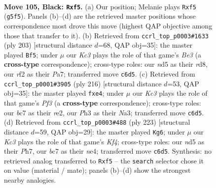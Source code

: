 \documentclass[11pt]{article}
\begin{document}
\clearpage

\begin{figure}[p]\centering
\begin{subfigure}{0.46\textwidth}\centering
\resizebox{\linewidth}{!}{%
\newchessgame
\chessboard[
  setfen={8/2B5/PPk5/3N1Brb/1K6/7p/5R2/8 b - - 10 105},
  showmover=false,
  pgfstyle=straightmove, color=movearrow, markmove={g5-f5}
]}
\caption{}
\end{subfigure}\hfill
\begin{subfigure}{0.46\textwidth}\centering
\resizebox{\linewidth}{!}{%
\newchessgame
\chessboard[
  setfen={3R4/p7/Pp2b3/1P1Bk3/2P5/1K6/8/2r5 b - - 48 102},
  showmover=false,
  pgfstyle=straightmove, color=movearrow, markmove={e6-f5}
]}
\caption{}
\end{subfigure}
\\[4pt]
\begin{subfigure}{0.46\textwidth}\centering
\resizebox{\linewidth}{!}{%
\newchessgame
\chessboard[
  setfen={8/5k2/R3b2p/4K3/4p2P/N4P2/4r3/8 w - - 0 109},
  showmover=false,
  pgfstyle=straightmove, color=movearrow, markmove={f3-e4}
]}
\caption{}
\end{subfigure}\hfill
\begin{subfigure}{0.46\textwidth}\centering
\resizebox{\linewidth}{!}{%
\newchessgame
\chessboard[
  setfen={8/7p/8/5k2/4Np1P/3K1P2/5B1r/8 b - - 82 112},
  showmover=false,
  pgfstyle=straightmove, color=movearrow, markmove={f5-g6}
]}
\caption{}
\end{subfigure}
\caption{\textbf{Move 105, Black: \texttt{Rxf5}.} (a) Our position; Melanie plays \texttt{Rxf5} (\texttt{g5f5}). Panels (b)--(d) are the retrieved master positions whose correspondence most drove this move (highest QAP objective among those that transfer to it). (b) Retrieved from \texttt{ccrl\_top\_p0003\#1633} (ply 203) [structural distance $d$=68, QAP obj=35]: the master played \texttt{Bf5}; under $\mu$ our \emph{Kc3} plays the role of that game's \emph{Be3} (a \textbf{cross-type} correspondence); cross-type roles: our \emph{n}d5 as their \emph{r}d8, our \emph{r}f2 as their \emph{P}a7; transferred move \texttt{c6d5}. (c) Retrieved from \texttt{ccrl\_top\_p0001\#3905} (ply 216) [structural distance $d$=53, QAP obj=35]: the master played \texttt{fxe4}; under $\mu$ our \emph{Kc3} plays the role of that game's \emph{Pf3} (a \textbf{cross-type} correspondence); cross-type roles: our \emph{b}c7 as their \emph{r}e2, our \emph{P}h3 as their \emph{N}a3; transferred move \texttt{c6d5}. (d) Retrieved from \texttt{ccrl\_top\_p0003\#488} (ply 223) [structural distance $d$=59, QAP obj=29]: the master played \texttt{Kg6}; under $\mu$ our \emph{Kc3} plays the role of that game's \emph{Kf4}; cross-type roles: our \emph{n}d5 as their \emph{P}h7, our \emph{b}c7 as their \emph{n}e4; transferred move \texttt{c6d5}. Synthesis: no retrieved analog transferred to \texttt{Rxf5} -- the \texttt{search} selector chose it on value (material / mate); panels (b)--(d) show the strongest nearby analogies.}
\label{fig:thought-m209}
\end{figure}
\end{document}
